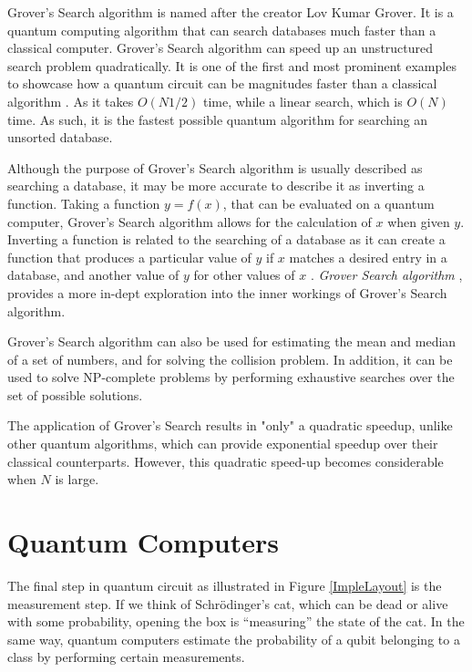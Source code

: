 Grover's Search algorithm is named after the creator Lov Kumar Grover. It is a quantum computing algorithm that can search databases much faster than a classical computer. Grover's Search algorithm can speed up an unstructured search problem quadratically. It is one of the first and most prominent examples to showcase how a quantum circuit can be magnitudes faster than a classical algorithm \citep{FrankZ}. As it takes $O(N1/2)$ time, while a linear search, which is $O(N)$ time. As such, it is the fastest possible quantum algorithm for searching an unsorted database. 

Although the purpose of Grover's Search algorithm is usually described as searching a database, it may be more accurate to describe it as inverting a function. Taking a function $y=f(x)$, that can be evaluated on a quantum computer, Grover's Search algorithm allows for the calculation of $x$ when given $y$. Inverting a function is related to the searching of a database as it can create a function that produces a particular value of $y$ if $x$ matches a desired entry in a database, and another value of $y$ for other values of $x$ \citep{GroversEx}. \citeauthor{EvaB}\emph{ Grover Search algorithm} \citep{EvaB}, provides a more in-dept exploration into the inner workings of Grover's Search algorithm.

Grover's Search algorithm can also be used for estimating the mean and median of a set of numbers, and for solving the collision problem. In addition, it can be used to solve NP-complete problems by performing exhaustive searches over the set of possible solutions. 

The application of Grover's Search results in "only" a quadratic speedup, unlike other quantum algorithms, which can provide exponential speedup over their classical counterparts. However, this quadratic speed-up becomes considerable when $N$ is large.





\section{Quantum Computers}
The final step in quantum circuit as illustrated in Figure \ref{ImpleLayout} is the measurement step. If we think of Schrödinger’s cat, which can be dead or alive with some probability, opening the box is “measuring” the state of the cat. In the same way, quantum computers estimate the probability of a qubit belonging to a class by performing certain measurements. 


